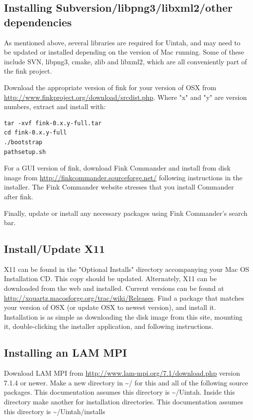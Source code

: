 \documentclass[12pt]{article}
\begin{document}
\subsection{Installing Subversion/libpng3/libxml2/other dependencies}
As mentioned above, several libraries are required for Uintah, and may need to be updated or installed depending on the version of Mac running.  Some of these include SVN, libpng3, cmake, zlib and libxml2, which are all conveniently part of the fink project.

Download the appropriate version of fink for your version of OSX from \url{http://www.finkproject.org/download/srcdist.php}.  Where "x" and "y" are version numbers, extract and install with:

\begin{verbatim}
tar -xvf fink-0.x.y-full.tar 
cd fink-0.x.y-full
./bootstrap 
pathsetup.sh
\end{verbatim}

For a GUI version of fink, download Fink Commander and install from disk image from \url{http://finkcommander.sourceforge.net/} following instructions in the installer.  The Fink Commander website stresses that you install Commander after fink.

Finally, update or install any necessary packages using Fink Commander's search bar.

\subsection{Install/Update X11}
X11 can be found in the "Optional Installs" directory accompanying your Mac OS Installation CD.  This copy should be updated.  Alternately, X11 can be downloaded from the web and installed.  Current versions can be found at \url{http://xquartz.macosforge.org/trac/wiki/Releases}.  Find a package that matches your version of OSX (or update OSX to newest version), and install it.  
Installation is as simple as downloading the disk image from this site, mounting it, double-clicking the installer application, and following instructions.

\subsection{Installing an LAM MPI}
Download LAM MPI from \url{http://www.lam-mpi.org/7.1/download.php} version 7.1.4 or newer.  Make a new directory in \textasciitilde/ for this and all of the following source packages.  This documentation assumes this directory is \textasciitilde/Uintah.  Inside this directory make another for installation directories.  This documentation assumes this directory is \textasciitilde/Uintah/installs
\end{document}
